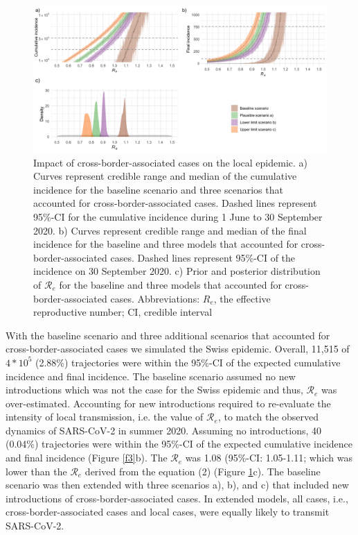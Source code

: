 \documentclass[10pt, a4paper, twoside]{article}
\begin{document}
\begin{multicols}{2}
\begin{figure}
\centering
\includegraphics[scale=0.15]{Figure2_2021-06-02.png}
\caption{Impact of cross-border-associated cases on the local epidemic.
a) Curves represent credible range and median of the cumulative incidence for the baseline scenario and three scenarios that accounted for cross-border-associated cases.
Dashed lines represent 95\%-CI for the cumulative incidence during 1 June to 30 September 2020.
b) Curves represent credible range and median of the final incidence for the baseline and three models that accounted for cross-border-associated cases.
Dashed lines represent 95\%-CI of the incidence on 30 September 2020.
c) Prior and posterior distribution of $\mathcal{R}_e$ for the baseline and three models that accounted for cross-border-associated cases.
Abbreviations: $R_e$, the effective reproductive number; CI, credible interval}

\label{f2}
\end{figure}

With the baseline scenario and three additional scenarios that accounted for cross-border-associated cases we simulated the Swiss epidemic.
Overall, 11,515 of $4*10^5$ (2.88\%) trajectories were within the 95\%-CI of the expected cumulative incidence and final incidence.
The baseline scenario assumed no new introductions which was not the case for the Swiss epidemic and thus, $\mathcal{R}_e$ was over-estimated.
Accounting for new introductions required to re-evaluate the intensity of local transmission, i.e. the value of $\mathcal{R}_e$, to match the observed dynamics of SARS-CoV-2 in summer 2020.
Assuming no introductions, 40 (0.04\%) trajectories were within the 95\%-CI of the expected cumulative incidence and final incidence (Figure \ref{f3}b).
The $\mathcal{R}_e$ was 1.08 (95\%-CI: 1.05-1.11; which was lower than the $\mathcal{R}_e$ derived from the equation (2) (Figure \ref{f2}c).
The baseline scenario was then extended with three scenarios a), b), and c) that included new introductions of cross-border-associated cases.
In extended models, all cases, i.e., cross-border-associated cases and local cases, were equally likely to transmit SARS-CoV-2.


\end{multicols}
\end{document}
